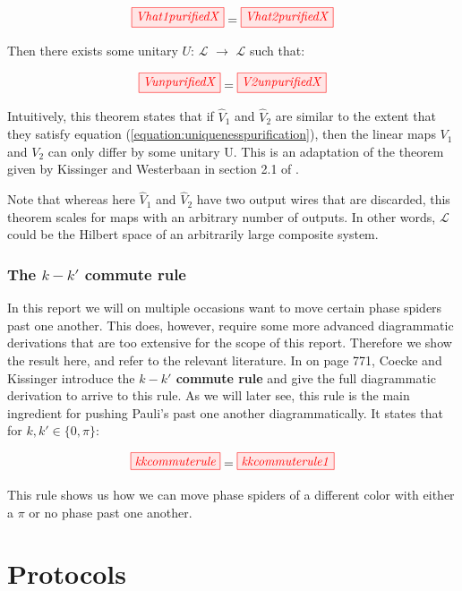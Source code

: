 \documentclass[]{article}
\begin{document}
\begin{equation}
	\label{equation:uniquenesspurification}
	\tikzfig{Vhat1purifiedX} = \tikzfig{Vhat2purifiedX}
\end{equation}

Then there exists some unitary $U$: $\mathcal{L}$ $\rightarrow$ $\mathcal{L}$ such that:

\begin{equation}
	\tikzfig{VunpurifiedX} = \tikzfig{V2unpurifiedX}
\end{equation}

Intuitively, this theorem states that if $\hat{V}_1$ and $\hat{V}_2$ are similar to the extent that they satisfy equation (\ref{equation:uniquenesspurification}), then the linear maps $V_1$ and $V_2$ can only differ by some unitary U. This is an adaptation of the theorem given by Kissinger and Westerbaan in section 2.1 of \cite{Kissinger2017}.

Note that whereas here $\hat{V}_1$ and $\hat{V}_2$ have two output wires that are discarded, this theorem scales for maps with an arbitrary number of outputs. In other words, $\mathcal{L}$ could be the Hilbert space of an arbitrarily large composite system.

\subsubsection{The $k-k'$ commute rule}
\label{section:kkcommute}
In this report we will on multiple occasions want to move certain phase spiders past one another. This does, however, require some more advanced diagrammatic derivations that are too extensive for the scope of this report. Therefore we show the result here, and refer to the relevant literature. In \cite{Coecke2017} on page 771, Coecke and Kissinger introduce the \textbf{$k-k'$ commute rule} and give the full diagrammatic derivation to arrive to this rule. As we will later see, this rule is the main ingredient for pushing Pauli's past one another diagrammatically. It states that for $k, k' \in \{0, \pi\}$: 

\begin{equation}
\label{equation:kkcommuterule}
\tikzfig{kkcommuterule} = \tikzfig{kkcommuterule1}
\end{equation}

This rule shows us how we can move phase spiders of a different color with either a $\pi$ or no phase past one another.

\section{Protocols}
\label{section:protocols}
\end{document}
